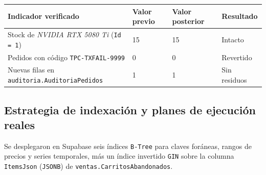 \begin{center}
\label{tab:tx-rollback-check}
\begin{tablaAPA}
\begin{tabular}{L{6.2cm} R{2.6cm} R{2.6cm} L{3.0cm}}
\toprule
\textbf{Indicador verificado} & \textbf{Valor previo} & \textbf{Valor posterior} & \textbf{Resultado} \\
\midrule
Stock de \textit{NVIDIA RTX 5080 Ti} (\texttt{Id = 1}) & 15 & 15 & Intacto \\
Pedidos con c\'odigo \texttt{TPC-TXFAIL-9999} & 0 & 0 & Revertido \\
Nuevas filas en \texttt{auditoria.AuditoriaPedidos} & 1 & 1 & Sin residuos \\
\bottomrule
\end{tabular}
\end{tablaAPA}
\end{center}

\subsection{Estrategia de indexaci\'on y planes de ejecuci\'on reales}

Se desplegaron en Supabase seis \'indices \texttt{B-Tree} para claves for\'aneas, rangos de precios y series temporales, m\'as un \'indice invertido \texttt{GIN} sobre la columna \texttt{ItemsJson} (\texttt{JSONB}) de \texttt{ventas.CarritosAbandonados}.

